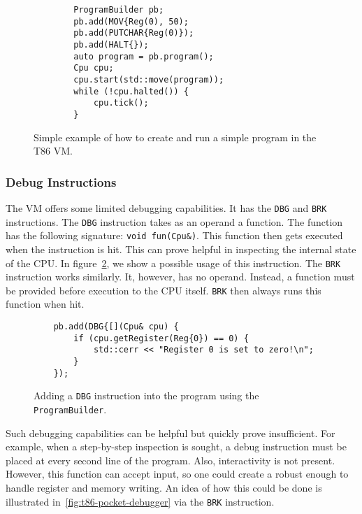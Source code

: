 \begin{figure}
    \begin{verbatim}
        ProgramBuilder pb;
        pb.add(MOV{Reg(0), 50);
        pb.add(PUTCHAR{Reg(0)});
        pb.add(HALT{});
        auto program = pb.program();
        Cpu cpu;
        cpu.start(std::move(program));
        while (!cpu.halted()) {
            cpu.tick();
        }
    \end{verbatim}
    \caption{Simple example of how to create and run a simple program in the T86 VM.}
    \label{fig:t86-intro}
\end{figure}

\subsubsection{Debug Instructions}\label{section:t86-debug-cap}
The VM offers some limited debugging capabilities. It has the \texttt{DBG} and
\texttt{BRK} instructions. The \texttt{DBG} instruction takes as an operand a
function. The function has the following signature: \texttt{void fun(Cpu\&)}.
This function then gets executed when the instruction is hit. This can prove
helpful in inspecting the internal state of the CPU. In
figure~\ref{fig:t86-debug}, we show a possible usage of this instruction. The
\texttt{BRK} instruction works similarly. It, however, has no operand. Instead,
a function must be provided before execution to the CPU itself. \texttt{BRK}
then always runs this function when hit.

\begin{figure}
    \begin{verbatim}
    pb.add(DBG{[](Cpu& cpu) {
        if (cpu.getRegister(Reg{0}) == 0) {
            std::cerr << "Register 0 is set to zero!\n";
        }
    });
    \end{verbatim}
    \caption{Adding a \texttt{DBG} instruction into the program using the
    \texttt{ProgramBuilder}.}
    \label{fig:t86-debug}
\end{figure}

Such debugging capabilities can be helpful but quickly prove insufficient. For
example, when a step-by-step inspection is sought, a debug instruction must be
placed at every second line of the program. Also, interactivity is not present.
However, this function can accept input, so one could create a robust enough to
handle register and memory writing. An idea of how this could be done is
illustrated in~\ref{fig:t86-pocket-debugger} via the \texttt{BRK} instruction.

